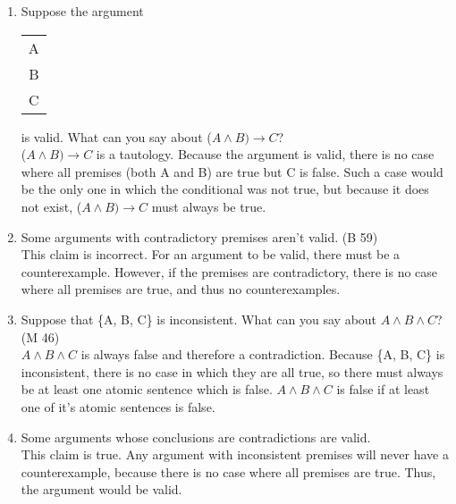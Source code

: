 \documentclass{article}
\begin{document}
\begin{enumerate}
{                  Update: it's fine, probably? See theorem-argument exchange (Theorem 1.1).}\\
            The argument is invalid. For ($A \land B) \to C$ to be contingent (and not a tautology), there must be at least one case where the conditional is false. This means there is a case where $A \land B$ is true but C is false, which would be a counterexample to the argument, rendering it invalid.
      \item Suppose the argument \begin{tabular}{c}A\\B\\\hline C\end{tabular} is valid. What can you say about ($A \land B) \to C$?\\
            ($A \land B) \to C$ is a tautology. Because the argument is valid, there is no case where all premises (both A and B) are true but C is false. Such a case would be the only one in which the conditional was not true, but because it does not exist, ($A \land B) \to C$ must always be true.
      \item Some arguments with contradictory premises aren't valid. (B 59)\\
            This claim is incorrect. For an argument to be valid, there must be a counterexample. However, if the premises are contradictory, there is no case where all premises are true, and thus no counterexamples.
      \item Suppose that \{A, B, C\} is inconsistent. What can you say about $A \land B \land C$? (M 46)\\
            $A \land B \land C$ is always false and therefore a contradiction. Because \{A, B, C\} is inconsistent, there is no case in which they are all true, so there must always be at least one atomic sentence which is false. $A \land B \land C$ is false if at least one of it's atomic sentences is false.
      \item Some arguments whose conclusions are contradictions are valid.\\
            This claim is true. Any argument with inconsistent premises will never have a counterexample, because there is no case where all premises are true. Thus, the argument would be valid.

\end{enumerate}
\end{document}
